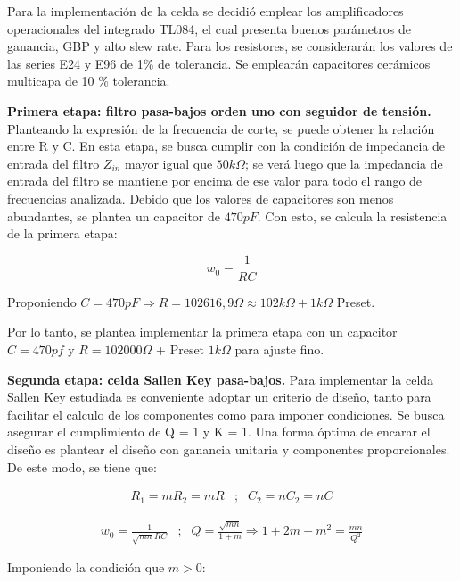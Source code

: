Para la implementación de la celda se decidió emplear los amplificadores operacionales del integrado TL084, el cual presenta buenos parámetros de ganancia, GBP y alto slew rate. Para los resistores, se considerarán los valores de las series E24 y E96 de 1\% de tolerancia. Se emplearán capacitores cerámicos multicapa de 10 \% tolerancia. 


\textbf{Primera etapa: filtro pasa-bajos orden uno con seguidor de tensión.} Planteando la expresión de la frecuencia de corte, se puede obtener la relación entre R y C. En esta etapa, se busca cumplir con la condición de impedancia de entrada del filtro $Z_{in}$ mayor igual que $50k \Omega$; se verá luego que la impedancia de entrada del filtro se mantiene por encima de ese valor para todo el rango de frecuencias analizada. Debido que los valores de capacitores son menos abundantes, se plantea un capacitor de $470 pF$. Con esto, se calcula la resistencia de la primera etapa:

$$w_{0} = \frac{1}{RC}$$

Proponiendo $C = 470pF \Rightarrow R = 102616,9 \Omega \approx 102k \Omega + 1k \Omega$ Preset.

Por lo tanto, se plantea implementar la primera etapa con un capacitor $C = 470 pf$ y $R = 102000 \Omega$ + Preset $1k\Omega$ para ajuste fino. 


\textbf{Segunda etapa: celda Sallen Key pasa-bajos.} Para implementar la celda Sallen Key estudiada es conveniente adoptar un criterio de diseño, tanto para facilitar el calculo de los componentes como para imponer condiciones. Se busca asegurar el cumplimiento de Q = 1 y K = 1. Una forma óptima de encarar el diseño es plantear el diseño con ganancia unitaria y componentes proporcionales. De este modo, se tiene que:

\begin{equation}
\begin{matrix}
R_{1} = mR_{2} = mR & ; & C_{2} = nC_{2} = nC
\end{matrix}
    \label{eq:SK13}
\end{equation}

\begin{equation}
\begin{matrix}
w_{0} = \frac{1}{\sqrt{mn}RC} & ; & Q = \frac{\sqrt{mn}}{1+m} \Rightarrow  1 + 2m + m^{2} = \frac{mn}{Q^{2}}
\end{matrix}
    \label{eq:SK14}
\end{equation}

Imponiendo la condición que $m > 0$:

